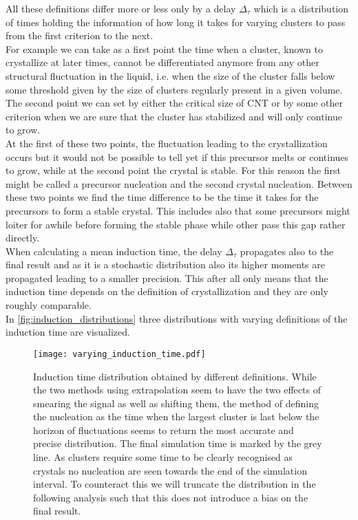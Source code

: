 All these definitions differ more or less only by a delay $\Delta_{\tau}$ which is a distribution of times holding the information of how long it takes for varying clusters to pass from the first criterion to the next.\\
For example we can take as a first point the time when a cluster, known to crystallize at later times, cannot be differentiated anymore from any other structural fluctuation in the liquid, i.e. when the size of the cluster falls below some threshold given by the size of clusters regularly present in a given volume.\\
The second point we can set by either the critical size of CNT or by some other criterion when we are sure that the cluster has stabilized and will only continue to grow.\\
At the first of these two points, the fluctuation leading to the crystallization occurs but it would not be possible to tell yet if this precursor melts or continues to grow, while at the second point the crystal is stable. For this reason the first might be called a precursor nucleation and the second crystal nucleation. Between these two points we find the time difference to be the time it takes for the precursors to form a stable crystal. This includes also that some precursors might loiter for awhile before forming the stable phase while other pass this gap rather directly.\\

When calculating a mean induction time, the delay $\Delta_{\tau}$ propagates also to the final result and as it is a stochastic distribution also its higher moments are propagated leading to a smaller precision. This after all only means that the induction time depends on the definition of crystallization and they are only roughly comparable.\\ 
In \autoref{fig:induction_distributions} three distributions with varying definitions of the induction time are visualized.

\begin{figure}[!h]
\centering
\texttt{[image: varying\_induction\_time.pdf]}
\caption[Comparison of different definitions for the induction time]{Induction time distribution obtained by different definitions. While the two methods using extrapolation seem to have the two effects of smearing the signal as well as shifting them, the method of defining the nucleation as the time when the largest cluster is last below the horizon of fluctuations seems to return the most accurate and precise distribution. The final simulation time is marked by the grey line. As clusters require some time to be clearly recognised as crystals no nucleation are seen towards the end of the simulation interval. To counteract this we will truncate the distribution in the following analysis such that this does not introduce a bias on the final result.}
\label{fig:induction_distributions}
\end{figure}

